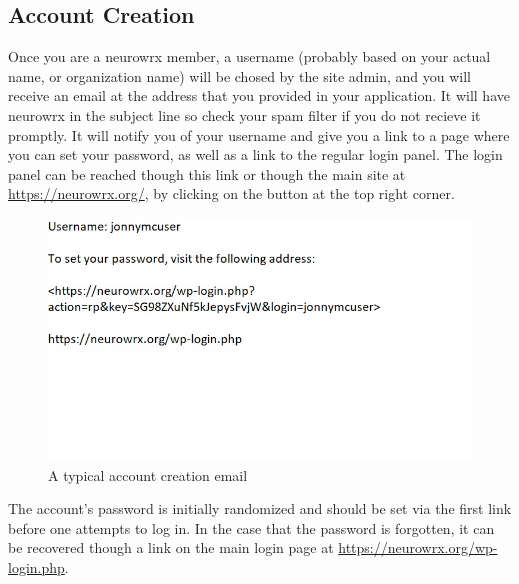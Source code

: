 \documentclass[10pt]{article}
\begin{document}
\subsection{Account Creation}

\begin{flushleft}
Once you are a neurowrx member, a username (probably based on your actual name, or organization name) will be chosed by the site admin, and you will receive an email at the address that you provided in your application.  It will have neurowrx in the subject line so check your spam filter if you do not recieve it promptly.  It will notify you of your username and give you a link to a page where you can set your password, as well as a link to the regular login panel.  The login panel can be reached though this link or though the main site at \url{https://neurowrx.org/}, by clicking on the button at the top right corner. 
\end{flushleft}

\begin{figure}[h]
\centering
\caption{A typical account creation email}
\label{accountemail}
\includegraphics[scale=1.0]{images/accountcreation.jpg}
\end{figure}

The account's password is initially randomized and should be set via the first link before one attempts to log in.  In the case that the password is forgotten, it can be recovered though a link on the main login page at \url{https://neurowrx.org/wp-login.php}.
\end{document}
